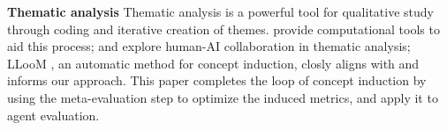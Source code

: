 \noindent\textbf{Thematic analysis}
Thematic analysis is a powerful tool for qualitative study through coding and
iterative creation of themes. \citet{gauthier2022computational} provide
computational tools to aid this process; \citet{hong2022scholastic} and \citet{gebreegziabher2023patat}
explore human-AI collaboration in thematic analysis; LLooM \citep{lam2024concept},
an automatic method for concept induction, closly aligns with and informs our approach.
This paper completes the loop of concept induction by using the meta-evaluation
step to optimize the induced metrics, and apply it to
agent evaluation.